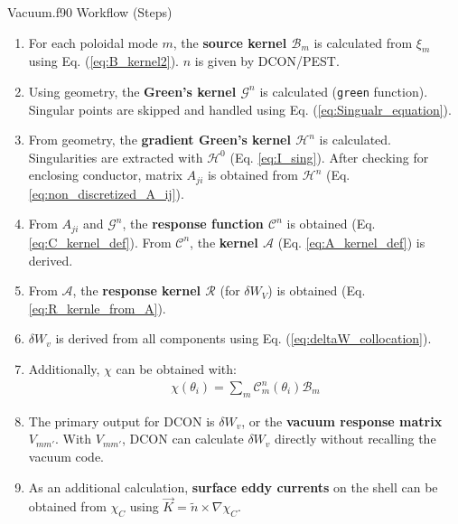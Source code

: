 \documentclass[8pt]{beamer}
\begin{document}
\begin{frame}{\color{white} Vacuum.f90 Workflow (Steps)}
\begin{enumerate}
     \item For each poloidal mode $m$, the \textbf{source kernel $\mathcal{B}_m$} is calculated from $\xi_m$ using Eq. (\ref{eq:B_kernel2}). $n$ is given by DCON/PEST.

     \item Using geometry, the \textbf{Green's kernel $\mathcal{G}^n$} is calculated (\texttt{green} function). Singular points are skipped and handled using Eq. (\ref{eq:Singualr_equation}).

     \item From geometry, the \textbf{gradient Green's kernel $\mathcal{H}^n$} is calculated. Singularities are extracted with $\mathcal{H}^0$ (Eq. \ref{eq:I_sing}). After checking for enclosing conductor, matrix $A_{ji}$ is obtained from $\mathcal{H}^n$ (Eq. \ref{eq:non_discretized_A_ij}).

     \item From $A_{ji}$ and $\mathcal{G}^n$, the \textbf{response function $\mathcal{C}^n$} is obtained (Eq. \ref{eq:C_kernel_def}). From $\mathcal{C}^n$, the \textbf{kernel $\mathcal{A}$} (Eq. \ref{eq:A_kernel_def}) is derived.

     \item From $\mathcal{A}$, the \textbf{response kernel $\mathcal{R}$} (for $\delta W_V$) is obtained (Eq. \ref{eq:R_kernle_from_A}).

     \item \textbf{$\delta W_v$} is derived from all components using Eq. (\ref{eq:deltaW_collocation}).

     \item Additionally, \textbf{$\chi$} can be obtained with:
     \begin{align}
         \chi(\theta_i) = \sum_m \mathcal{C}^n_{m}(\theta_i) \mathcal{B}_m
     \end{align}

     \item The primary output for DCON is $\delta W_v$, or the \textbf{vacuum response matrix} $V_{mm'}$. With $V_{mm'}$, DCON can calculate $\delta W_v$ directly without recalling the vacuum code.
     
     \item As an additional calculation, \textbf{surface eddy currents} on the shell can be obtained from $\chi_C$ using $\vec{K} = \tilde{n} \times \nabla \chi_C$.
\end{enumerate}
\end{frame}
\end{document}
